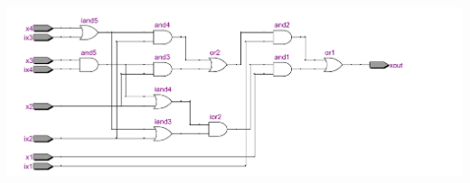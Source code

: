 \documentclass[a4paper]{article}
\begin{document}
\includegraphics[scale=0.50]{images/endsk.pdf}

\end{document}
